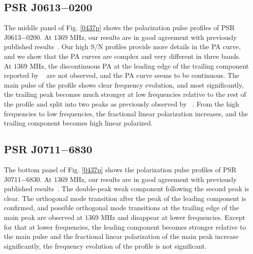 \documentclass[useAMS,usenatbib]{mn2e}
\begin{document}
\subsection{PSR J0613$-$0200}

The middle panel of Fig. \ref{0437p} shows the polarization pulse profiles of 
PSR J0613$-$0200.
%
At $1369$ MHz, our results are in good agreement with previously published
results~\citep{Ord04,Yan11}. 
%
Our high S/N profiles provide more details in the PA curve, and we show that 
the PA curves are complex and very different in three bands. 
%
At $1369$ MHz, the discontinuous PA at the leading edge of the trailing 
component reported by ~\citet{Yan11} are not observed, and the PA curve seems 
to be continuous.
%
The main pulse of the profile shows clear frequency evolution, and most 
significantly, the trailing peak becomes much stronger at low frequencies 
relative to the rest of the profile and split into two peaks as previously
observed by ~\citet{Stairs99}.
%
From the high frequencies to low frequencies, the fractional linear 
polarization increases, and the trailing component becomes high linear 
polarized. 
%


\subsection{PSR J0711$-$6830}

The bottom panel of Fig. \ref{0437p} shows the polarization pulse profiles 
of PSR J0711$-$6830.
%
At $1369$ MHz, our results are in good agreement with previously published
results~\citep{Ord04,Yan11}. 
%
The double-peak weak component following the second peak is clear.
%
The orthogonal mode transition after the peak of the leading component 
is confirmed, and possible orthogonal mode transitions at the trailing edge 
of the main peak are observed at $1369$ MHz and disappear at lower frequencies.
%
Except for that at lower frequencies, the leading component becomes stronger  
relative to the main pulse and the fractional linear polarization of the 
main peak increase significantly, the frequency evolution of the profile 
is not significant.
\end{document}
